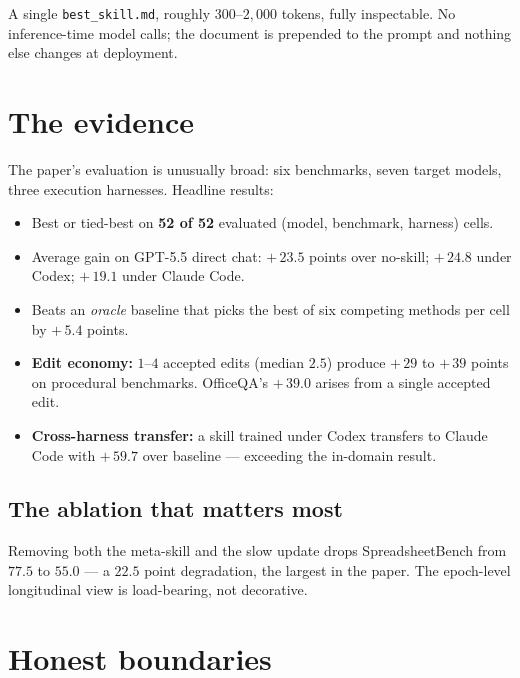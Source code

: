 \documentclass[11pt,a4paper]{article}
\begin{document}
A single \texttt{best\_skill.md}, roughly \(300\)--\(2{,}000\) tokens,
fully inspectable. No inference-time model calls; the document is
prepended to the prompt and nothing else changes at deployment.

\section{The evidence}

The paper's evaluation is unusually broad: six benchmarks, seven target
models, three execution harnesses. Headline results:

\begin{itemize}[leftmargin=1.4em]
  \item Best or tied-best on \textbf{52 of 52} evaluated
  (model, benchmark, harness) cells.
  \item Average gain on GPT-5.5 direct chat: \(+\,23.5\) points over
  no-skill; \(+\,24.8\) under Codex; \(+\,19.1\) under Claude Code.
  \item Beats an \emph{oracle} baseline that picks the best of six
  competing methods per cell by \(+\,5.4\) points.
  \item \textbf{Edit economy:} \(1\)--\(4\) accepted edits (median
  \(2.5\)) produce \(+\,29\) to \(+\,39\) points on procedural
  benchmarks. OfficeQA's \(+\,39.0\) arises from a single accepted edit.
  \item \textbf{Cross-harness transfer:} a skill trained under Codex
  transfers to Claude Code with \(+\,59.7\) over baseline --- exceeding
  the in-domain result.
\end{itemize}

\subsection{The ablation that matters most}

Removing both the meta-skill and the slow update drops SpreadsheetBench
from \(77.5\) to \(55.0\) --- a \(22.5\) point degradation, the largest
in the paper. The epoch-level longitudinal view is load-bearing, not
decorative.

\section{Honest boundaries}
\end{document}
